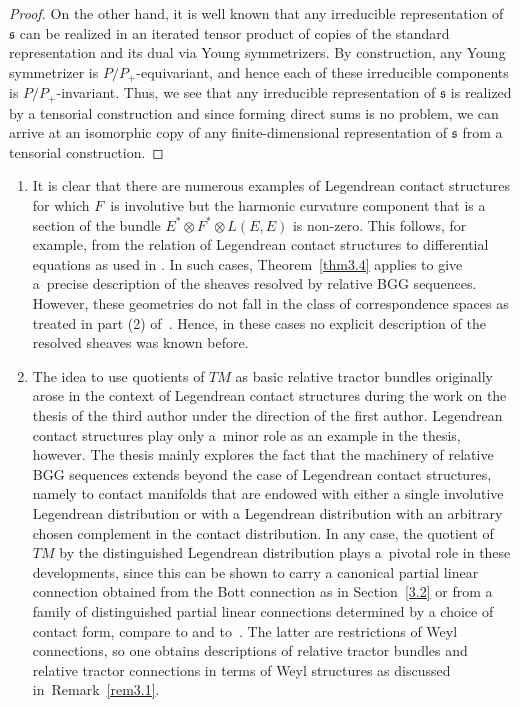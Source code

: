 \documentclass[10pt,a4paper]{amsart}
\numberwithin{equation}{section}
\def\frak{\mathfrak}
\begin{document}
\begin{proof}
On the other hand, it is well known that any irreducible representation of $\frak s$
can be realized in an iterated tensor product of copies of the standard
representation and its dual via Young symmetrizers. By construction, any Young
symmetrizer is $P/P_+$-equivariant, and hence each of these irreducible components is
$P/P_+$-invariant. Thus, we see that any irreducible representation of $\frak s$ is
realized by a tensorial construction and since forming direct sums is no problem, we
can arrive at an isomorphic copy of any finite-dimensional representation of $\frak
s$ from a tensorial construction.
\end{proof}

\begin{Remark}\label{rem3.4} \quad
\begin{enumerate}\itemsep=0pt
\item[(1)] It is clear that there are numerous examples of
Legendrean contact structures for which $F$~is involutive but the harmonic curvature
component that is a section of the bundle $E^*\otimes F^*\otimes L(E,E)$ is non-zero.
This follows, for example, from the relation of Legendrean contact structures to
differential equations as used in \cite{MFMZ}. In such cases, Theorem~\ref{thm3.4}
applies to give a~precise description of the sheaves resolved by relative BGG
sequences. However, these geometries do not fall in the class of correspondence
spaces as treated in part (2) of~\mbox{\cite[Theorem~4.11]{Rel-BGG2}}. Hence, in these
cases no explicit description of the resolved sheaves was known before.
\item[(2)] The idea to use quotients of $TM$ as basic relative tractor bundles originally
arose in the context of Legendrean contact structures during the work on the thesis
\cite{Michal-thesis} of the third author under the direction of the first
author. Legendrean contact structures play only a~minor role as an example in the
thesis, however. The thesis mainly explores the fact that the machinery of relative
BGG sequences extends beyond the case of Legendrean contact structures, namely to
contact manifolds that are endowed with either a single involutive Legendrean
distribution or with a Legendrean distribution with an arbitrary chosen complement in
the contact distribution. In any case, the quotient of $TM$ by the distinguished
Legendrean distribution plays a~pivotal role in these developments, since this can be
shown to carry a canonical partial linear connection obtained from the Bott
connection as in Section~\ref{3.2} or from a family of distinguished partial linear
connections determined by a choice of contact form, compare to \cite[Section 5.2.14]{book}
and to~\cite{Michal-article}. The latter are restrictions of Weyl
connections, so one obtains descriptions of relative tractor bundles and relative
tractor connections in terms of Weyl structures as discussed in~Remark~\ref{rem3.1}.
\end{enumerate}
\end{Remark}
\end{document}

